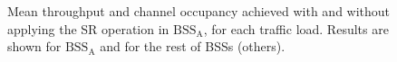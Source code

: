 \documentclass{ieeeaccess}
\begin{document}
\begin{figure}[ht!]
	\centering		
	\caption{Mean throughput and channel occupancy achieved with and without applying the SR operation in $\text{BSS}_\text{A}$, for each traffic load. Results are shown for $\text{BSS}_\text{A}$ and for the rest of BSSs (others).}
	\label{fig:SIM_2_2}
\end{figure}
\end{document}
